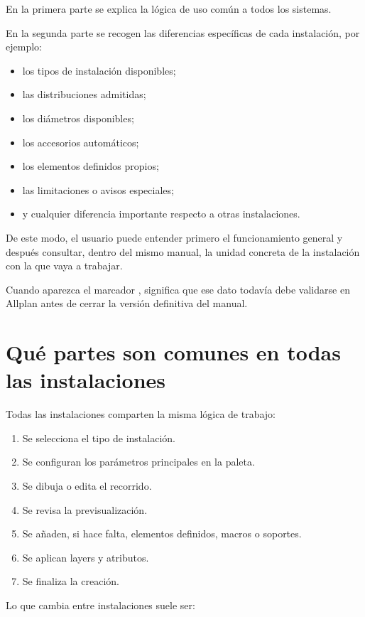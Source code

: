 En la primera parte se explica la lógica de uso común a todos los sistemas.

En la segunda parte se recogen las diferencias específicas de cada instalación, por ejemplo:

\begin{itemize}
\item los tipos de instalación disponibles;
\item las distribuciones admitidas;
\item los diámetros disponibles;
\item los accesorios automáticos;
\item los elementos definidos propios;
\item las limitaciones o avisos especiales;
\item y cualquier diferencia importante respecto a otras instalaciones.
\end{itemize}

De este modo, el usuario puede entender primero el funcionamiento general y después consultar, dentro del mismo manual, la unidad concreta de la instalación con la que vaya a trabajar.

Cuando aparezca el marcador \pendingtag, significa que ese dato todavía debe validarse en Allplan antes de cerrar la versión definitiva del manual.

\section{Qué partes son comunes en todas las instalaciones}

Todas las instalaciones comparten la misma lógica de trabajo:

\begin{enumerate}
\item Se selecciona el tipo de instalación.
\item Se configuran los parámetros principales en la paleta.
\item Se dibuja o edita el recorrido.
\item Se revisa la previsualización.
\item Se añaden, si hace falta, elementos definidos, macros o soportes.
\item Se aplican layers y atributos.
\item Se finaliza la creación.
\end{enumerate}

Lo que cambia entre instalaciones suele ser:

